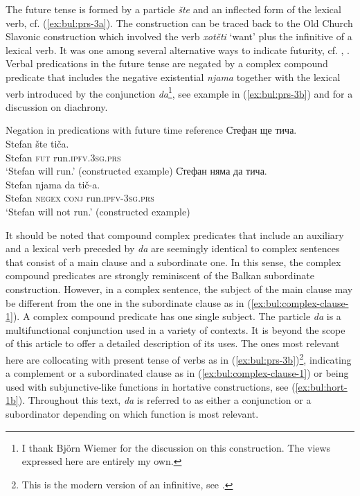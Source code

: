 \documentclass[output=paper,colorlinks=true, citecolor=brown]{langscibook}
\begin{document}
The future tense is formed by a particle \textit{šte} and an inflected form of the lexical verb, cf. (\ref{ex:bul:prs-3a}). The construction can be traced back to the Old Church Slavonic construction which involved the verb \textit{xotěti} `want' plus the infinitive of a lexical verb. It was one among several alternative ways to indicate futurity, cf. \citet[418]{Duridanov1991}, \citet[288-296]{Slavova217}. Verbal predications in the future tense are negated by a complex compound predicate that includes the negative existential \textit{njama} together with the lexical verb introduced by the conjunction \textit{da}\footnote{I thank Björn Wiemer for the discussion on this construction. The views expressed here are entirely my own.}, see example in (\ref{ex:bul:prs-3b}) and  for a discussion on diachrony.

\ea Negation in predications with future time reference\label{ex:bul:prs-3}
  \ea С̇тефан ще тича.\label{ex:bul:prs-3a} \\ 
  	\gll Stefan šte tiča. \\
     Stefan \textsc{fut} run.\textsc{ipfv}.\textsc{3sg}.\textsc{prs}\\
    \glt `Stefan will run.' (constructed example)
  \ex С̇тефан няма да тича.\label{ex:bul:prs-3b}\\
  	\gll Stefan njama da  tič-a.\\
  	Stefan \textsc{negex} \textsc{conj} run.\textsc{ipfv}-\textsc{3sg}.\textsc{prs} \\
    \glt `Stefan will not run.' (constructed example)
  \z 
\z

It should be noted that compound complex predicates that include an auxiliary and a lexical verb preceded by \textit{da} are seemingly identical to complex sentences that consist of a main clause and a subordinate one. In this sense, the complex compound predicates are strongly reminiscent of the Balkan subordinate construction. However, in a complex sentence, the subject of the main clause may be different from the one in the subordinate clause as in (\ref{ex:bul:complex-clause-1}). A complex compound predicate has one single subject. The particle \textit{da} is a multifunctional conjunction used in a variety of contexts. It is beyond the scope of this article to offer a detailed description of its uses. The ones most relevant here are collocating with present tense of verbs as in (\ref{ex:bul:prs-3b})\footnote{This is the modern version of an infinitive, see \citet[378]{Scatton1980}.}, indicating a complement or a subordinated clause as in (\ref{ex:bul:complex-clause-1}) or being used with subjunctive-like functions in hortative constructions, see (\ref{ex:bul:hort-1b}). Throughout this text, \textit{da} is referred to as either a conjunction or a subordinator depending on which function is most relevant.
\end{document}
